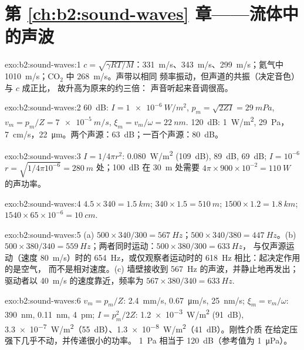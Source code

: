 \section*{第 \ref{ch:b2:sound-waves} 章——流体中的声波}

\begin{solution}{exo:b2:sound-waves:1}
$c = \sqrt{\gamma RT/M}$：\qty{331}{m/s}、\qty{343}{m/s}、\qty{299}{m/s}；氦气中
\qty{1010}{m/s}；CO$_2$ 中 \qty{268}{m/s}。声带以相同
频率振动，但声道的共振（决定音色）与 $c$ 成正比，
故升高为原来的约三倍：
声音听起来音调很高。
\end{solution}

\begin{solution}{exo:b2:sound-waves:2}
\qty{60}{dB}: $I = \qty{1e-6}{W/m^2}$, $p_m = \sqrt{2ZI} = \qty{29}{mPa}$, $v_m = p_m/Z =
\qty{7e-5}{m/s}$, $\xi_m = v_m/\omega = \qty{22}{nm}$. \qty{120}{dB}: \qty{1}{W/m^2},
\qty{29}{Pa}，\qty{7}{cm/s}，\qty{22}{\micro m}。两个声源：\qty{63}{dB}；一百个声源：\qty{80}{dB}。
\end{solution}

\begin{solution}{exo:b2:sound-waves:3}
$I = 1/4\pi r^2$: \qty{0.080}{W/m^2} (\qty{109}{dB}), \qty{89}{dB}, \qty{69}{dB}; $I = 10^{-6}$
$r = \sqrt{1/4\pi10^{-6}} = \qty{280}{m}$ 处；\qty{100}{dB} 在 \qty{30}{m} 处需要 $4\pi \times
900 \times 10^{-2} = \qty{110}{W}$ 的声功率。
\end{solution}

\begin{solution}{exo:b2:sound-waves:4}
$4.5 \times 340 = \qty{1.5}{km}$; $340 \times 1.5 = \qty{510}{m}$; $1500 \times 1.2 = \qty{1.8}{km}$;
$1540 \times 65 \times 10^{-6} = \qty{10}{cm}$.
\end{solution}

\begin{solution}{exo:b2:sound-waves:5}
(a) $500 \times 340/300 = \qty{567}{Hz}$；$500 \times 340/380 = \qty{447}{Hz}$。(b) $500 \times
380/340 = \qty{559}{Hz}$；两者同时运动：$500 \times 380/300 = \qty{633}{Hz}$，
与仅声源运动（速度 \qty{80}{m/s}）时的 \qty{654}{Hz}，或仅观察者运动时的 \qty{618}{Hz} 相比：起决定作用的是空气，
而不是相对速度。(c) 墙壁接收到 \qty{567}{Hz}
的声波，并静止地再发出；驱动者以 \qty{40}{m/s} 的速度靠近，频率为 $567 \times
380/340 = \qty{633}{Hz}$.
\end{solution}

\begin{solution}{exo:b2:sound-waves:6}
$v_m = p_m/Z$: \qty{2.4}{mm/s}, \qty{0.67}{\micro m/s}, \qty{25}{nm/s}; $\xi_m = v_m/\omega$:
\qty{390}{nm}, \qty{0.11}{nm}, \qty{4}{pm}; $I = p_m^2/2Z$: \qty{1.2e-3}{W/m^2} (\qty{91}{dB}),
\qty{3.3e-7}{W/m^2}（\qty{55}{dB}）、\qty{1.3e-8}{W/m^2}（\qty{41}{dB}）。刚性介质
在给定压强下几乎不动，并传递很小的功率。
\qty{1}{Pa} 相当于 \qty{120}{dB}（参考值为 \qty{1}{\micro Pa}）。
\end{solution}

